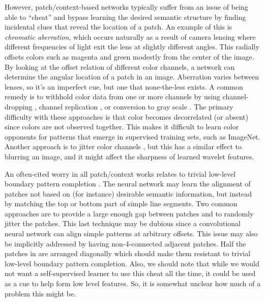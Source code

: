 \documentclass[10pt,twocolumn,letterpaper]{article}
\begin{document}
However, patch/context-based networks typically suffer from an issue of being able to ``cheat'' and bypass learning the desired semantic structure by finding incidental clues that reveal the location of a patch. An example of this is \emph{chromatic aberration}, which occurs naturally as a result of camera lensing where different frequencies of light exit the lens at slightly different angles. This radially offsets colors such as magenta and green modestly from the center of the image. By looking at the offset relation of different color channels, a network can determine the angular location of a patch in an image. Aberration varies between lenses, so it's an imperfect cue, but one that none-the-less exists. A common remedy is to withhold color data from one or more channels by using channel-dropping \cite{Doersch15,Doersch17}, channel replication \cite{Lee17}, or conversion to gray scale \cite{Noroozi17}.  The primary difficulty with these approaches is that color becomes decorrelated (or absent) since colors are not observed together. This makes it difficult to learn color opponents for patterns that emerge in supervised training sets, such as ImageNet. Another approach is to jitter color channels \cite{Noroozi16a}, but this has a similar effect to blurring an image, and it might affect the sharpness of learned wavelet features.

An often-cited worry in all patch/context works relates to trivial low-level boundary pattern completion \cite{Doersch15,Noroozi16a,Doersch17,Noroozi17,Lee17}. The neural network may learn the alignment of patches not based on (for instance) desirable semantic information, but instead by matching the top or bottom part of simple line segments. Two common approaches are to provide a large enough gap between patches and to randomly jitter the patches. This last technique may be dubious since a convolutional neural network can align simple patterns at arbitrary offsets. This issue may also be implicitly addressed by having non-4-connected adjacent patches. Half the patches in \cite{Doersch15} are arranged diagonally which should make them resistant to trivial low-level boundary pattern completion. Also, we should note that while we would not want a self-supervised learner to use this cheat all the time, it could be used as a cue to help form low level features. So, it is somewhat unclear how much of a problem this might be. 
\end{document}
